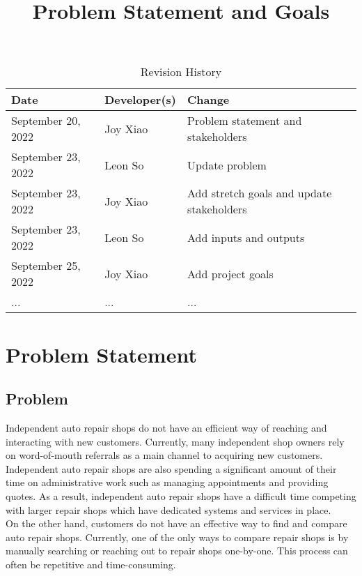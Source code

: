 \documentclass{article}
\title{Problem Statement and Goals\\\progname}
\author{\authname}
\date{}
\begin{document}
\maketitle

\begin{table}[hp]
\caption{Revision History} \label{TblRevisionHistory}
\begin{tabularx}{\textwidth}{llX}
\toprule
\textbf{Date} & \textbf{Developer(s)} & \textbf{Change}\\
\midrule
September 20, 2022 & Joy Xiao & Problem statement and stakeholders\\
September 23, 2022 & Leon So & Update problem\\
September 23, 2022 & Joy Xiao & Add stretch goals and update stakeholders\\
September 23, 2022 & Leon So & Add inputs and outputs\\
September 25, 2022 & Joy Xiao & Add project goals\\
... & ... & ...\\
\bottomrule
\end{tabularx}
\end{table}

\section{Problem Statement}


\subsection{Problem}
Independent auto repair shops do not have an efficient way of reaching and interacting with new customers.
Currently, many independent shop owners rely on word-of-mouth referrals as a main channel to acquiring new customers. 
Independent auto repair shops are also spending a significant amount of their time on administrative work such as 
managing appointments and providing quotes. As a result, independent auto repair shops have a difficult time 
competing with larger repair shops which have dedicated systems and services in place.\\

On the other hand, customers do not have an effective way to find and compare auto repair shops. 
Currently, one of the only ways to compare repair shops is by manually searching or reaching out to repair shops one-by-one. 
This process can often be repetitive and time-consuming.
\end{document}
